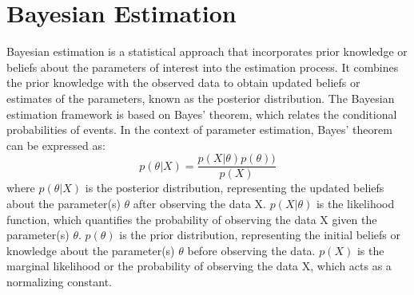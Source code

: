 \section{Bayesian Estimation}
Bayesian estimation is a statistical approach that incorporates prior knowledge or beliefs about the parameters of interest into the estimation process. It combines the prior knowledge with the observed data to obtain updated beliefs or estimates of the parameters, known as the posterior distribution.
The Bayesian estimation framework is based on Bayes' theorem, which relates the conditional probabilities of events. In the context of parameter estimation, Bayes' theorem can be expressed as:
\begin{equation}
    p(\theta | X) = \frac{p(X | \theta)p(\theta))}{p(X)}
\end{equation}
where $p(\theta | X)$ is the posterior distribution, representing the updated beliefs about the parameter(s) $\theta$ after observing the data X. $p(X | \theta)$ is the likelihood function, which quantifies the probability of observing the data X given the parameter(s) $\theta$. $p(\theta)$ is the prior distribution, representing the initial beliefs or knowledge about the parameter(s) $\theta$ before observing the data. $p(X)$ is the marginal likelihood or the probability of observing the data X, which acts as a normalizing constant.
